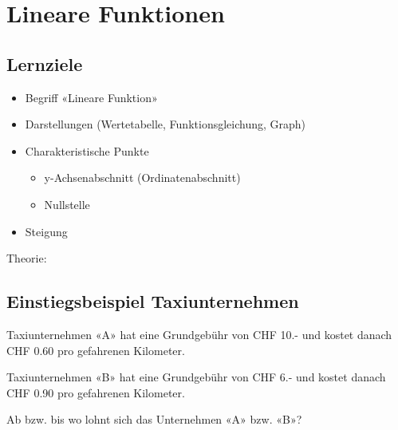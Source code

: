
\section{Lineare Funktionen}
\label{lineare_funktionen}
\subsection*{Lernziele}

\begin{itemize}
\item Begriff «Lineare Funktion»
\item Darstellungen (Wertetabelle, Funktionsgleichung, Graph)
\item Charakteristische Punkte
  \begin{itemize}
  \item
    y-Achsenabschnitt (Ordinatenabschnitt)
  \item Nullstelle
  \end{itemize}
\item Steigung
\end{itemize}

Theorie:
\newpage

\subsection{Einstiegsbeispiel Taxiunternehmen}
Taxiunternehmen «A» hat eine Grundgebühr von CHF 10.- und kostet
danach CHF 0.60 pro gefahrenen Kilometer.

Taxiunternehmen «B» hat eine Grundgebühr von CHF 6.- und kostet
danach CHF 0.90 pro gefahrenen Kilometer.

Ab bzw. bis wo lohnt sich das Unternehmen «A» bzw. «B»?


\newpage
